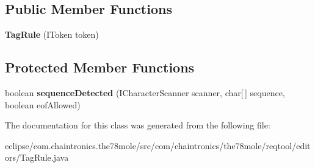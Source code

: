 \subsection*{Public Member Functions}
\begin{DoxyCompactItemize}
\item 
{\bfseries Tag\+Rule} (I\+Token token)\hypertarget{classcom_1_1chaintronics_1_1the78mole_1_1reqtool_1_1editors_1_1TagRule_a0676c599d4e25168dece4f6165753799}{}\label{classcom_1_1chaintronics_1_1the78mole_1_1reqtool_1_1editors_1_1TagRule_a0676c599d4e25168dece4f6165753799}

\end{DoxyCompactItemize}
\subsection*{Protected Member Functions}
\begin{DoxyCompactItemize}
\item 
boolean {\bfseries sequence\+Detected} (I\+Character\+Scanner scanner, char\mbox{[}$\,$\mbox{]} sequence, boolean eof\+Allowed)\hypertarget{classcom_1_1chaintronics_1_1the78mole_1_1reqtool_1_1editors_1_1TagRule_a5eda9ef246d8c0b0d127008d62f13acd}{}\label{classcom_1_1chaintronics_1_1the78mole_1_1reqtool_1_1editors_1_1TagRule_a5eda9ef246d8c0b0d127008d62f13acd}

\end{DoxyCompactItemize}


The documentation for this class was generated from the following file\+:\begin{DoxyCompactItemize}
\item 
eclipse/com.\+chaintronics.\+the78mole/src/com/chaintronics/the78mole/reqtool/editors/Tag\+Rule.\+java\end{DoxyCompactItemize}
